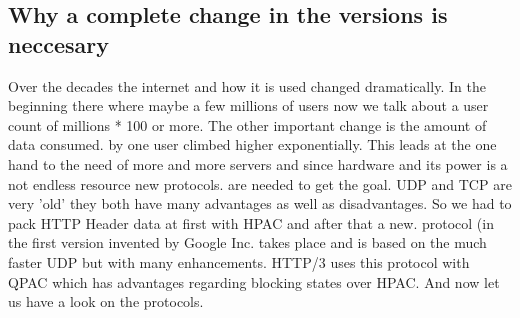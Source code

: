 \documentclass[10pt,a4paper,english]{article}
\begin{document}
\begin{multicols}{2}
\subsection{Why a complete change in the versions is neccesary }
\begin{flushleft}
Over the decades the internet and how it is used changed dramatically. In the beginning there where maybe a few millions of users now we talk about a user count of millions * 100 or more. The other important change is the amount of data consumed. by one user climbed higher exponentially. This leads at the one hand to the need of more and more servers and since hardware and its power is a not endless resource new protocols. are needed to get the goal. UDP and TCP are very 'old' they both have many advantages as well as disadvantages. So we had to pack HTTP Header data at first with HPAC and after that a new. protocol (in the first version invented by Google Inc. takes place and is based on the much faster UDP but with many enhancements. HTTP/3 uses this protocol with QPAC which has advantages regarding blocking states over HPAC. And now let us have a look on the protocols.
       
\end{flushleft}

\end{multicols}
\end{document}
